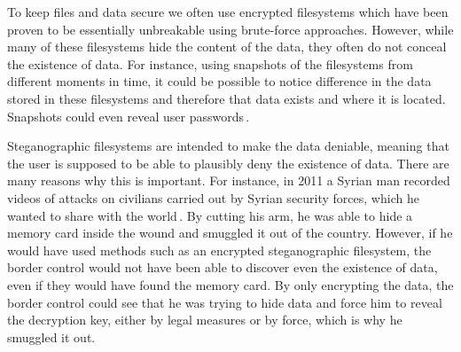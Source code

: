 


To keep files and data secure we often use encrypted filesystems which have been proven to be essentially unbreakable using brute-force approaches. However, while many of these filesystems hide the content of the data, they often do not conceal the existence of data. For instance, using snapshots of the filesystems from different moments in time, it could be possible to notice difference in the data stored in these filesystems and therefore that data exists and where it is located. Snapshots could even reveal user passwords\,\cite{hanMultiuserSteganographicFile2010}.

Steganographic filesystems are intended to make the data deniable, meaning that the user is supposed to be able to plausibly deny the existence of data. There are many reasons why this is important. For instance, in 2011 a Syrian man recorded videos of attacks on civilians carried out by Syrian security forces, which he wanted to share with the world\,\cite{westheadHowSyrianRefugee2012}. By cutting his arm, he was able to hide a memory card inside the wound and smuggled it out of the country. However, if he would have used methods such as an encrypted steganographic filesystem, the border control would not have been able to discover even the existence of data, even if they would have found the memory card. By only encrypting the data, the border control could see that he was trying to hide data and force him to reveal the decryption key, either by legal measures or by force, which is why he smuggled it out.

